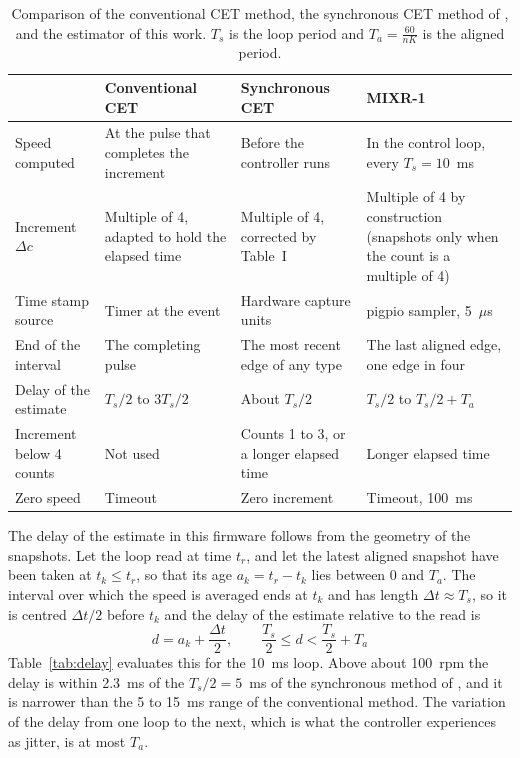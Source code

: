 \begin{table}[htbp]
    \centering
    \caption[Conventional CET, synchronous CET and the MIXR-1 estimator]{Comparison of the conventional CET method, the synchronous CET method of \citet{anuchin2019}, and the estimator of this work. $T_s$ is the loop period and $T_a = \frac{60}{nK}$ is the aligned period.}
    \label{tab:cet-compare}
    \small
    \begin{tabular}{@{}p{}p{}p{}p{}@{}}
        \toprule
        & Conventional CET & Synchronous CET & MIXR-1 \\
        \midrule
        Speed computed & At the pulse that completes the increment & Before the controller runs & In the control loop, every $T_s = 10$~ms \\
        Increment $\Delta c$ & Multiple of 4, adapted to hold the elapsed time & Multiple of 4, corrected by Table~I & Multiple of 4 by construction (snapshots only when the count is a multiple of 4) \\
        Time stamp source & Timer at the event & Hardware capture units & pigpio sampler, 5~$\mu$s \\
        End of the interval & The completing pulse & The most recent edge of any type & The last aligned edge, one edge in four \\
        Delay of the estimate & $T_s/2$ to $3T_s/2$ & About $T_s/2$ & $T_s/2$ to $T_s/2 + T_a$ \\
        Increment below 4 counts & Not used & Counts 1 to 3, or a longer elapsed time & Longer elapsed time \\
        Zero speed & Timeout & Zero increment & Timeout, 100~ms \\
        \bottomrule
    \end{tabular}
\end{table}

The delay of the estimate in this firmware follows from the geometry of the snapshots. Let the loop read at time $t_r$, and let the latest aligned snapshot have been taken at $t_k \leq t_r$, so that its age $a_k = t_r - t_k$ lies between 0 and $T_a$. The interval over which the speed is averaged ends at $t_k$ and has length $\Delta t \approx T_s$, so it is centred $\Delta t/2$ before $t_k$ and the delay of the estimate relative to the read is
\begin{equation}
    d = a_k + \frac{\Delta t}{2}, \qquad \frac{T_s}{2} \leq d < \frac{T_s}{2} + T_a
    \label{eq:delay}
\end{equation}
Table~\ref{tab:delay} evaluates this for the 10~ms loop. Above about 100~rpm the delay is within 2.3~ms of the $T_s/2 = 5$~ms of the synchronous method of \citet{anuchin2019}, and it is narrower than the 5 to 15~ms range of the conventional method. The variation of the delay from one loop to the next, which is what the controller experiences as jitter, is at most $T_a$.

